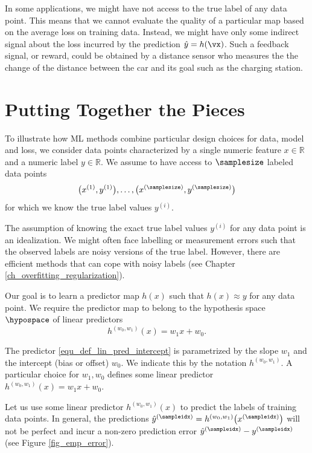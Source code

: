 \documentclass[12pt]{report}
\begin{document}
In some applications, we might have not access to the true label of any 
data point. This means that we cannot evaluate the quality of a particular 
map based on the average loss on training data. Instead, we might have 
only some indirect signal about the loss incurred by the prediction 
$\hat{y}=h(\vx)$. Such a feedback signal, or reward, could be obtained 
by a distance sensor who measures the the change of the distance 
between the car and its goal such as the charging station. 

\section{Putting Together the Pieces} 
\label{sec_putting_togehter_the_pieces}

To illustrate how ML methods combine particular design choices for 
data, model and loss, we consider data points characterized by a single 
numeric feature $x \in \mathbb{R}$ and a numeric label $y \in \mathbb{R}$. 
We assume to have access to $\samplesize$ labeled data points 
\begin{equation} 
\big(x^{(1)},y^{(1)}\big),\ldots, \big(x^{(\samplesize)},y^{(\samplesize)}\big)  \label{equ_labeled_data_putting_together}
\end{equation} 
for which we know the true label values $y^{(i)}$. 

The assumption of knowing the exact true label values $y^{(i)}$ 
for any data point is an idealization. We might often face labelling 
or measurement errors such that the observed labels are noisy 
versions of the true label. However, there are efficient methods 
that can cope with noisy labels (see Chapter \ref{ch_overfitting_regularization}). 

Our goal is to learn a predictor map $h(x)$ such that $h(x) \approx y$ 
for any data point. We require the predictor map to belong to 
the hypothesis space $\hypospace$ of linear predictors 
\begin{equation} 
\label{equ_def_lin_pred_intercept}
h^{(w_{0},w_{1})}(x) = w_{1} x + w_{0}. 
\end{equation}

The predictor \eqref{equ_def_lin_pred_intercept} is parametrized by the slope 
$w_{1}$ and the intercept (bias or offset) $w_{0}$. We indicate this by the 
notation $h^{(w_{0},w_{1})}$. A particular choice for $w_{1},w_{0}$ 
defines some linear predictor $h^{(w_{0},w_{1})}(x) = w_{1}x +w_{0}$. 

Let us use some linear predictor $h^{(w_{0},w_{1})}(x)$ to predict the labels of 
training data points. In general, the predictions $\hat{y}^{(\sampleidx)} = h^{(w_{0},w_{1})}\big(x^{(\sampleidx)}\big)$ 
will not be perfect and incur a non-zero prediction error $\hat{y}^{(\sampleidx)} - y^{(\sampleidx)}$ (see Figure \ref{fig_emp_error}).  
\end{document}
